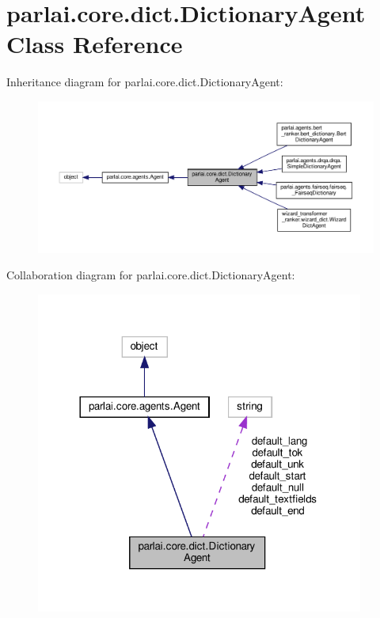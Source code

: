 \hypertarget{classparlai_1_1core_1_1dict_1_1DictionaryAgent}{}\section{parlai.\+core.\+dict.\+Dictionary\+Agent Class Reference}
\label{classparlai_1_1core_1_1dict_1_1DictionaryAgent}


Inheritance diagram for parlai.\+core.\+dict.\+Dictionary\+Agent\+:
\nopagebreak
\begin{figure}[H]
\begin{center}
\leavevmode
\includegraphics[width=350pt]{classparlai_1_1core_1_1dict_1_1DictionaryAgent__inherit__graph}
\end{center}
\end{figure}


Collaboration diagram for parlai.\+core.\+dict.\+Dictionary\+Agent\+:
\nopagebreak
\begin{figure}[H]
\begin{center}
\leavevmode
\includegraphics[width=305pt]{classparlai_1_1core_1_1dict_1_1DictionaryAgent__coll__graph}
\end{center}
\end{figure}
